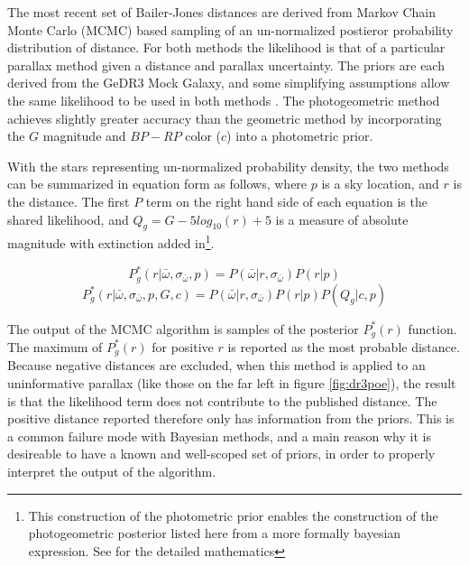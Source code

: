 \documentclass[preprint2]{aastex631}
\begin{document}
The most recent set of Bailer-Jones distances are derived from Markov Chain Monte Carlo (MCMC) based sampling of an un-normalized postieror probability distribution of distance. For both methods the likelihood is that of a particular parallax method given a distance and parallax uncertainty. The priors are each derived from the GeDR3 Mock Galaxy, and some simplifying assumptions allow the same likelihood to be used in both methods \citep{bailer-jonesEstimating2021}. The photogeometric method achieves slightly greater accuracy than the geometric method by incorporating the $G$ magnitude and $BP-RP$ color ($c$) into a photometric prior.

With the stars representing un-normalized probability density, the two methods can be summarized in equation form as follows, where $p$ is a sky location, and $r$ is the distance. The first $P$ term on the right hand side of each equation is the shared likelihood, and $Q_g = G - 5 log_{10}(r) + 5$ is a measure of absolute magnitude with extinction added in\footnote{This construction of the photometric prior enables the construction of the photogeometric posterior listed here from a more formally bayesian expression. See \cite{bailer-jonesEstimating2021} for the detailed mathematics }.

$$ P_g^* (r| \bar{\omega}, \sigma_{\bar{\omega}}, p) = P(\bar{\omega} | r, \sigma_{\bar{\omega}}) P (r | p)$$
$$ P_g^* (r| \bar{\omega}, \sigma_{\bar{\omega}}, p, G, c) = P(\bar{\omega} | r, \sigma_{\bar{\omega}}) P (r | p) P(Q_g| c, p)$$

The output of the MCMC algorithm is samples of the posterior $P_g^*(r)$ function. The maximum of $P_g^*(r)$ for positive $r$ is reported as the most probable distance. Because negative distances are excluded, when this method is applied to an uninformative parallax (like those on the far left in figure \ref{fig:dr3poe}), the result is that the likelihood term does not contribute to the published distance. The positive distance reported therefore only has information from the priors. This is a common failure mode with Bayesian methods, and a main reason why it is desireable to have a known and well-scoped set of priors, in order to properly interpret the output of the algorithm.
\end{document}
